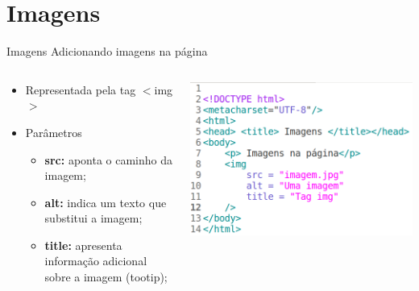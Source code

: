 \documentclass{beamer}
\begin{document}
\section{Imagens}
\begin{frame}{Imagens}
  Adicionando imagens na página
  \begin{columns}
    \begin{column}{0.45 \textwidth}
     \begin{itemize}
      \item Representada pela tag $<$img$>$
       \item Parâmetros
      \begin{itemize}
	 \item \textbf{src:} aponta o caminho da imagem;
	 \item \textbf{alt:} indica um texto que substitui a imagem;
	 \item \textbf{title:} apresenta informação adicional sobre a 
imagem (tootip);
      \end{itemize}
    
     \end{itemize}
    
    \end{column}
    \begin{column}{0.5\textwidth}
     \includegraphics[height=0.45\paperheight]{fig/aula1/html8.png}
    \end{column}
  \end{columns}
\end{frame}
\end{document}
